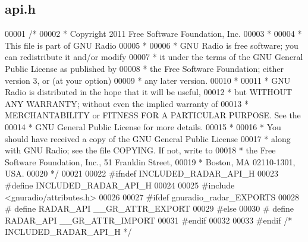 \subsection{api.\+h}
\label{api_8h_source}

\begin{DoxyCode}
00001 \textcolor{comment}{/*}
00002 \textcolor{comment}{ * Copyright 2011 Free Software Foundation, Inc.}
00003 \textcolor{comment}{ *}
00004 \textcolor{comment}{ * This file is part of GNU Radio}
00005 \textcolor{comment}{ *}
00006 \textcolor{comment}{ * GNU Radio is free software; you can redistribute it and/or modify}
00007 \textcolor{comment}{ * it under the terms of the GNU General Public License as published by}
00008 \textcolor{comment}{ * the Free Software Foundation; either version 3, or (at your option)}
00009 \textcolor{comment}{ * any later version.}
00010 \textcolor{comment}{ *}
00011 \textcolor{comment}{ * GNU Radio is distributed in the hope that it will be useful,}
00012 \textcolor{comment}{ * but WITHOUT ANY WARRANTY; without even the implied warranty of}
00013 \textcolor{comment}{ * MERCHANTABILITY or FITNESS FOR A PARTICULAR PURPOSE.  See the}
00014 \textcolor{comment}{ * GNU General Public License for more details.}
00015 \textcolor{comment}{ *}
00016 \textcolor{comment}{ * You should have received a copy of the GNU General Public License}
00017 \textcolor{comment}{ * along with GNU Radio; see the file COPYING.  If not, write to}
00018 \textcolor{comment}{ * the Free Software Foundation, Inc., 51 Franklin Street,}
00019 \textcolor{comment}{ * Boston, MA 02110-1301, USA.}
00020 \textcolor{comment}{ */}
00021 
00022 \textcolor{preprocessor}{#ifndef INCLUDED\_RADAR\_API\_H}
00023 \textcolor{preprocessor}{#define INCLUDED\_RADAR\_API\_H}
00024 
00025 \textcolor{preprocessor}{#include <gnuradio/attributes.h>}
00026 
00027 \textcolor{preprocessor}{#ifdef gnuradio\_radar\_EXPORTS}
00028 \textcolor{preprocessor}{#  define RADAR\_API \_\_GR\_ATTR\_EXPORT}
00029 \textcolor{preprocessor}{#else}
00030 \textcolor{preprocessor}{#  define RADAR\_API \_\_GR\_ATTR\_IMPORT}
00031 \textcolor{preprocessor}{#endif}
00032 
00033 \textcolor{preprocessor}{#endif }\textcolor{comment}{/* INCLUDED\_RADAR\_API\_H */}\textcolor{preprocessor}{}
\end{DoxyCode}
